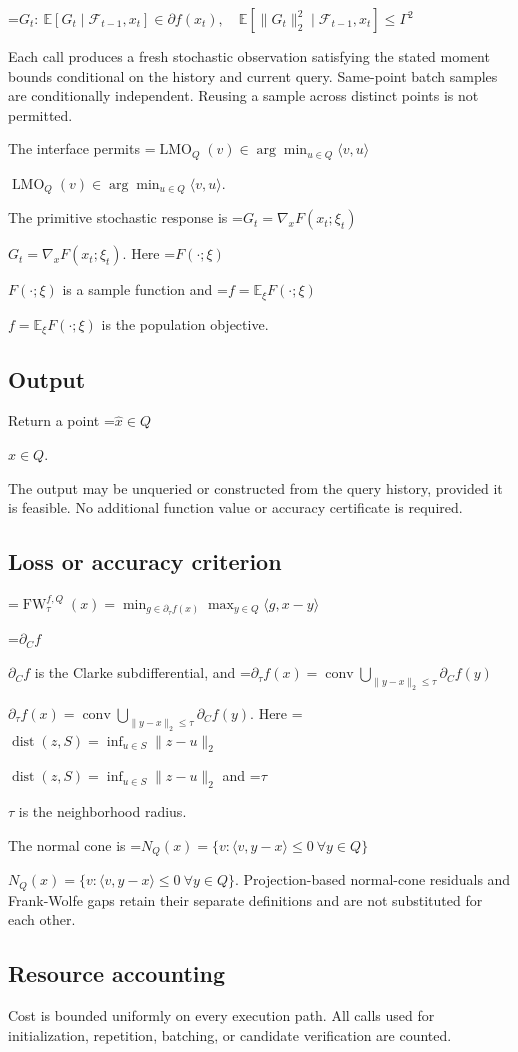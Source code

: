 \documentclass[10pt,a4paper]{article}
\newcommand{\AtlasMath}[1]{\par\begingroup\centering\setbox0=\hbox{$\displaystyle #1$}\ifdim\wd0>1.4\linewidth\typeout{ATLAS WIDE FORMULA: \the\wd0}\fi\ifdim\wd0>\linewidth\resizebox{\linewidth}{!}{\box0}\else\box0\fi\par\endgroup}
\newcommand{\AtlasInlineMath}[1]{\begingroup\setbox0=\hbox{$#1$}\ifdim\wd0>.4\linewidth\endgroup\AtlasMath{#1}\else\endgroup$#1$\fi}
\begin{document}
\AtlasMath{G_t:\ \mathbb{E}[G_t\mid\mathcal{F}_{t-1},x_t]\in\partial f(x_t),\quad\mathbb{E}[\|G_t\|_2^2\mid\mathcal{F}_{t-1},x_t]\le\Gamma^2}


Each call produces a fresh stochastic observation satisfying the stated moment bounds conditional on the history and current query. Same-point batch samples are conditionally independent. Reusing a sample across distinct points is not permitted.

The interface permits \AtlasInlineMath{\operatorname{LMO}_Q(v)\in\arg\min_{u\in Q}\langle v,u\rangle}.

The primitive stochastic response is \AtlasInlineMath{G_t=\nabla_x F(x_t;\xi_t)}. Here \AtlasInlineMath{F(\cdot;\xi)} is a sample function and \AtlasInlineMath{f=\mathbb E_\xi F(\cdot;\xi)} is the population objective.

\subsection{Output}
Return a point \AtlasInlineMath{\widehat x\in Q}.

The output may be unqueried or constructed from the query history, provided it is feasible. No additional function value or accuracy certificate is required.

\subsection{Loss or accuracy criterion}

\AtlasMath{\operatorname{FW}_\tau^{f,Q}(x)=\min_{g\in\partial_\tau f(x)}\max_{y\in Q}\langle g,x-y\rangle}


\AtlasInlineMath{\partial_C f} is the Clarke subdifferential, and \AtlasInlineMath{\partial_\tau f(x)=\operatorname{conv}\bigcup_{\|y-x\|_2\le\tau}\partial_C f(y)}. Here \AtlasInlineMath{\operatorname{dist}(z,S)=\inf_{u\in S}\|z-u\|_2} and \AtlasInlineMath{\tau} is the neighborhood radius.

The normal cone is \AtlasInlineMath{N_Q(x)=\{v:\langle v,y-x\rangle\le0\ \forall y\in Q\}}. Projection-based normal-cone residuals and Frank-Wolfe gaps retain their separate definitions and are not substituted for each other.

\subsection{Resource accounting}
Cost is bounded uniformly on every execution path. All calls used for initialization, repetition, batching, or candidate verification are counted.
\end{document}
